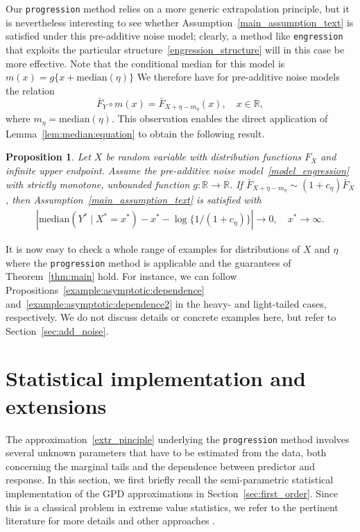 \documentclass{statsoc}
\newtheorem{proposition}{Proposition}
\theoremstyle{break}
\def\M{\text{median}}
\newcommand{\beao}{\begin{eqnarray*}}
\newcommand{\eeao}{\end{eqnarray*}\noindent}
\begin{document}
Our \texttt{progression} method relies on a more generic extrapolation principle, but it is nevertheless interesting to see whether Assumption~\eqref{main_assumption_text} is satisfied under this pre-additive noise model; clearly, a method like \texttt{engression} that exploits the particular structure~\eqref{engression_structure} will in this case be more effective.
Note that the conditional median for this model is $m(x) = g\{x + \M(\eta)\}$
We therefore have for pre-additive noise models the relation 
\[\bar F_Y \circ m(x) = \bar F_{X+\eta-m_\eta}(x), \quad x \in\mathbb R, \]
where $m_\eta = \M(\eta)$. This observation enables the direct application of Lemma~\ref{lem:median:equation} to obtain the following result.
\begin{proposition}
	Let $X$ be random variable with distribution functions $F_X$ and infinite upper endpoint.
	Assume the pre-additive noise model~\eqref{model_engression} with strictly monotone, unbounded function $g:\mathbb R\to \mathbb R$. If $\bar F_{X+\eta - m_\eta} \sim (1+c_\eta) \bar F_X$, then Assumption~\ref{main_assumption_text} is satisfied with
	\beao 
	|\M( Y^* \mid X^* = x^*) - x^* - \log\{1/(1+c_\eta)\}| \to 0, \quad x^* \to \infty.
	\eeao 
\end{proposition}
It is now easy to check a whole range of examples for distributions of $X$ and $\eta$ where the \texttt{progression} method is applicable and the guarantees of Theorem~\ref{thm:main} hold. For instance, we can follow Propositions~\ref{example:asymptotic:dependence} and~\ref{example:asymptotic:dependence2} in the heavy- and light-tailed cases, respectively. We do not discuss details or concrete examples here, but refer to Section~\ref{sec:add_noise}.



\section{Statistical implementation and extensions} \label{sec:statistics}


The approximation~\eqref{extr_pinciple} underlying the \texttt{progression} method involves several unknown parameters that have to be estimated from the data, both concerning the marginal tails and the dependence between predictor and response. In this section, we first briefly recall the semi-parametric statistical implementation of the GPD approximations in Section~\ref{sec:first_order}. 
Since this is a classical problem in extreme value statistics, 
we refer to the pertinent literature for more details and other approaches \citep[e.g.,][]{coles:2001}.
\end{document}
